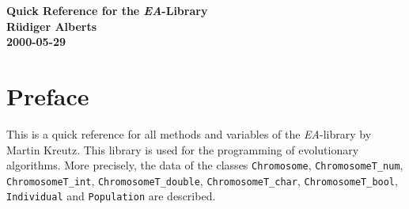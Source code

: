 \documentclass[12pt]{report}
\begin{document}
\textheight 23cm
\topmargin -0.54cm
\textwidth 16.5cm
\oddsidemargin -0.04cm
\evensidemargin -0.54cm


\newif\ifmethodgray
\methodgrayfalse
\def\method#1#2{%
  \ifmethodgray
    \psframebox*[framesep=1pt,fillcolor=lightgray,fillstyle=solid]{%
      \begin{minipage}{.873\textwidth}
        \begin{minipage}{17em} #1 \end{minipage}
        \begin{minipage}{17.7em} #2 \end{minipage}
      \end{minipage}}
    \methodgrayfalse
  \else
    \psframebox*[framesep=1pt]{%
      \begin{minipage}{.873\textwidth}
        \begin{minipage}{17em} #1 \end{minipage}
        \begin{minipage}{17.7em} #2 \end{minipage}
      \end{minipage}}
    \methodgraytrue
  \fi
}


\begin{center}
{\Large {\bf Quick Reference for the {\em EA}-Library}}\\
{\bf R\"udiger Alberts}\\
{\bf 2000-05-29}
\end{center}

\newpage
\tableofcontents
\newpage

\chapter{Preface}
This is a quick reference for all methods and variables
of the {\em EA}-library by Martin Kreutz. This library is
used for the programming of evolutionary algorithms.
More precisely, the data of the classes
{\tt Chromosome}, {\tt ChromosomeT\_num}, {\tt ChromosomeT\_int},
{\tt ChromosomeT\_double}, {\tt ChromosomeT\_char}, 
{\tt Chro\-mo\-someT\_bool}, {\tt Individual} and {\tt Population} 
are described.
\end{document}

